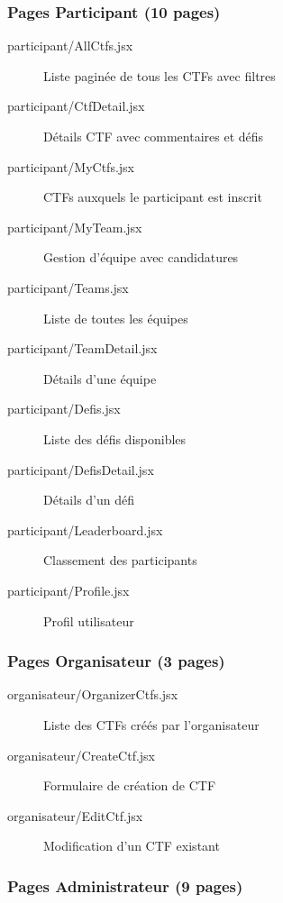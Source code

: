 \subsubsection{Pages Participant (10 pages)}

\begin{description}
    \item[participant/AllCtfs.jsx] Liste paginée de tous les CTFs avec filtres
    \item[participant/CtfDetail.jsx] Détails CTF avec commentaires et défis
    \item[participant/MyCtfs.jsx] CTFs auxquels le participant est inscrit
    \item[participant/MyTeam.jsx] Gestion d'équipe avec candidatures
    \item[participant/Teams.jsx] Liste de toutes les équipes
    \item[participant/TeamDetail.jsx] Détails d'une équipe
    \item[participant/Defis.jsx] Liste des défis disponibles
    \item[participant/DefisDetail.jsx] Détails d'un défi
    \item[participant/Leaderboard.jsx] Classement des participants
    \item[participant/Profile.jsx] Profil utilisateur
\end{description}

\subsubsection{Pages Organisateur (3 pages)}

\begin{description}
    \item[organisateur/OrganizerCtfs.jsx] Liste des CTFs créés par l'organisateur
    \item[organisateur/CreateCtf.jsx] Formulaire de création de CTF
    \item[organisateur/EditCtf.jsx] Modification d'un CTF existant
\end{description}

\subsubsection{Pages Administrateur (9 pages)}

